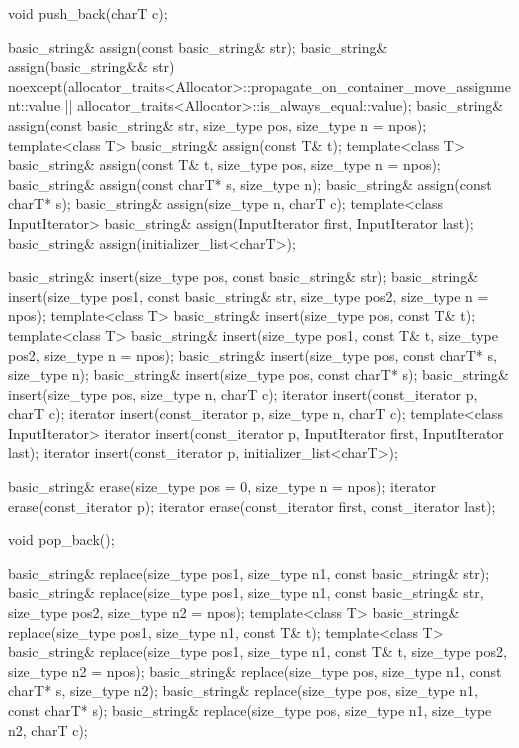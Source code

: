 \begin{codeblock}
{{    void push_back(charT c);

    basic_string& assign(const basic_string& str);
    basic_string& assign(basic_string&& str)
      noexcept(allocator_traits<Allocator>::propagate_on_container_move_assignment::value ||
               allocator_traits<Allocator>::is_always_equal::value);
    basic_string& assign(const basic_string& str, size_type pos, size_type n = npos);
    template<class T>
      basic_string& assign(const T& t);
    template<class T>
      basic_string& assign(const T& t, size_type pos, size_type n = npos);
    basic_string& assign(const charT* s, size_type n);
    basic_string& assign(const charT* s);
    basic_string& assign(size_type n, charT c);
    template<class InputIterator>
      basic_string& assign(InputIterator first, InputIterator last);
    basic_string& assign(initializer_list<charT>);

    basic_string& insert(size_type pos, const basic_string& str);
    basic_string& insert(size_type pos1, const basic_string& str,
                         size_type pos2, size_type n = npos);
    template<class T>
      basic_string& insert(size_type pos, const T& t);
    template<class T>
      basic_string& insert(size_type pos1, const T& t, size_type pos2, size_type n = npos);
    basic_string& insert(size_type pos, const charT* s, size_type n);
    basic_string& insert(size_type pos, const charT* s);
    basic_string& insert(size_type pos, size_type n, charT c);
    iterator insert(const_iterator p, charT c);
    iterator insert(const_iterator p, size_type n, charT c);
    template<class InputIterator>
      iterator insert(const_iterator p, InputIterator first, InputIterator last);
    iterator insert(const_iterator p, initializer_list<charT>);

    basic_string& erase(size_type pos = 0, size_type n = npos);
    iterator erase(const_iterator p);
    iterator erase(const_iterator first, const_iterator last);

    void pop_back();

    basic_string& replace(size_type pos1, size_type n1, const basic_string& str);
    basic_string& replace(size_type pos1, size_type n1, const basic_string& str,
                          size_type pos2, size_type n2 = npos);
    template<class T>
      basic_string& replace(size_type pos1, size_type n1, const T& t);
    template<class T>
      basic_string& replace(size_type pos1, size_type n1, const T& t,
                            size_type pos2, size_type n2 = npos);
    basic_string& replace(size_type pos, size_type n1, const charT* s, size_type n2);
    basic_string& replace(size_type pos, size_type n1, const charT* s);
    basic_string& replace(size_type pos, size_type n1, size_type n2, charT c);

}}
\end{codeblock}
